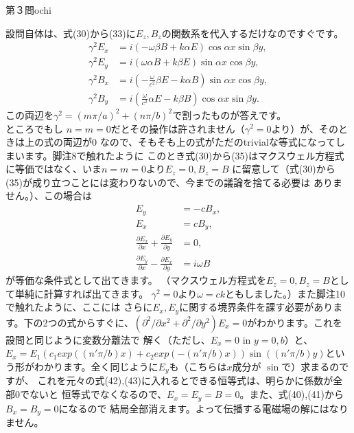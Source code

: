 \begin{answer}{第３問}{ochi}
\begin{enumerate}
  設問自体は、式(30)から(33)に$E_z,B_z$の関数系を代入するだけなのですぐです。
  \begin{align}
    \gamma^2E_x&=i(-\omega\beta B+k\alpha E)\cos \alpha x \sin \beta y,\\
    \gamma^2E_y&=i(\omega\alpha B+k\beta E)\sin \alpha x \cos \beta y,\\
    \gamma^2B_x&=i(-\frac{\omega}{c^2}\beta E-k\alpha B)\sin \alpha x \cos \beta y,\\
    \gamma^2B_y&=i(\frac{\omega}{c^2}\alpha E-k\beta B)\cos \alpha x \sin \beta y.
  \end{align}
  この両辺を$\gamma^2=(m\pi/a)^2+(n\pi/b)^2$で割ったものが答えです。\\

  ところでもし
  $n=m=0$だとその操作は許されません（$\gamma^2=0$より）が、そのときは上の式の両辺が$0$
  なので、そもそも上の式がただのtrivialな等式になってしまいます。脚注8で触れたように
  このとき式(30)から(35)はマクスウェル方程式に等価ではなく、いま$n=m=0$より$E_z=0,B_z=B$
  に留意して（式(30)から(35)が成り立つことには変わりないので、今までの議論を捨てる必要は
  ありません。）、この場合は
  \begin{align}
    E_y &=-cB_x,\\
    E_x &=cB_y,\\
    \frac{\partial E_x}{\partial x}+\frac{\partial E_y}{\partial y}&=0,\\
    \frac{\partial E_y}{\partial x}-\frac{\partial E_x}{\partial y}&=i\omega B
  \end{align}
  が等価な条件式として出てきます。
  （マクスウェル方程式を$E_z=0,B_z=B$として単純に計算すれば出てきます。
  $\gamma^2=0$より$\omega=ck$ともしました。）また脚注10で触れたように、ここには
  さらに$E_x,E_y$に関する境界条件を課す必要があります。下の2つの式からすぐに、$(\partial^2/\partial x^2+
  \partial^2/\partial y^2)E_x=0$がわかります。これを設問と同じように変数分離法で
  解く（ただし、$E_x=0$ in $y=0,b$）と、$E_x=E_1(c_1exp((n'\pi/b)x)+c_2exp(-(n'\pi/b)x)
  )\sin ((n'\pi/b)y)$という形がわかります。全く同じように$E_y$も（こちらは$x$成分が
  $\sin$で）求まるのですが、
  これを元々の式(42),(43)に入れるとできる恒等式は、明らかに係数が全部$0$でないと
  恒等式でなくなるので、$E_x=E_y=B=0$。また、式(40),(41)から$B_x=B_y=0$になるので
  結局全部消えます。よって伝播する電磁場の解にはなりません。


\end{enumerate}
\end{answer}
